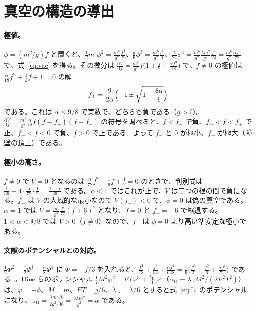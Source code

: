 \documentclass[a4paper,10pt]{ltjsarticle}
\newcommand{\dd}{\mathrm{d}}
\begin{document}
\section{真空の構造の導出}\label{app:vacuum}

\paragraph{極値。}$\phi=(m^2/g)f$ と置くと、$\frac12m^2\phi^2=\frac{m^6}{g^2}\frac{f^2}{2}$、$\frac g6\phi^3=\frac{m^6}{g^2}\frac{f^3}{6}$、$\frac{\lambda}{24}\phi^4=\frac{m^6}{g^2}\frac{\lambda m^2}{g^2}\frac{f^4}{24}=\frac{m^6}{g^2}\frac{\alpha f^4}{72}$ で、式~\eqref{eq:vac} を得る。その微分は $\frac{\dd V}{\dd f}=\frac{m^6}{g^2}f\bigl(1+\frac f2+\frac{\alpha f^2}{18}\bigr)$ で、$f\ne0$ の極値は $\frac{\alpha}{18}f^2+\frac12f+1=0$ の解
\begin{equation*}
f_\pm=\frac{9}{2\alpha}\Bigl(-1\pm\sqrt{1-\frac{8\alpha}{9}}\Bigr)
\end{equation*}
である。これは $\alpha\le9/8$ で実数で、どちらも負である（$g>0$）。$\frac{\dd V}{\dd f}=\frac{m^6}{g^2}\frac{\alpha}{18}f(f-f_+)(f-f_-)$ の符号を調べると、$f<f_-$ で負、$f_-<f<f_+$ で正、$f_+<f<0$ で負、$f>0$ で正である。よって $f_-$ と $0$ が極小、$f_+$ が極大（障壁の頂上）である。

\paragraph{極小の高さ。}$f\ne0$ で $V=0$ となるのは $\frac{\alpha}{72}f^2+\frac16f+\frac12=0$ のときで、判別式は $\frac1{36}-4\cdot\frac{\alpha}{72}\cdot\frac12=\frac{1-\alpha}{36}$ である。$\alpha<1$ ではこれが正で、$V$ は二つの根の間で負になる。$f_-$ は $V$ の大域的な最小なので $V(f_-)<0$ で、$\phi=0$ は偽の真空である。$\alpha=1$ では $V=\frac{m^6}{g^2}\frac{f^2}{72}(f+6)^2$ となり、$f=0$ と $f_-=-6$ で縮退する。$1<\alpha<9/8$ では $V>0$（$f\neq0$）なので、$f_-$ は $\phi=0$ より高い準安定な極小である。

\paragraph{文献のポテンシャルとの対応。}$\frac12\Phi^2-\frac12\Phi^3+\frac\alpha8\Phi^4$ に $\Phi=-f/3$ を入れると、$\frac{f^2}{18}+\frac{f^3}{54}+\frac{\alpha f^4}{648}=\frac19\bigl(\frac{f^2}2+\frac{f^3}6+\frac{\alpha f^4}{72}\bigr)$ である~\cite{dunnemin}。Dine らのポテンシャル $\frac12M^2\varphi^2-ET\varphi^3+\frac{\lambda_{\mathrm D}}4\varphi^4$（$\alpha_{\mathrm D}=\lambda_{\mathrm D}M^2/(2E^2T^2)$）~\cite{dine92} は、$\varphi=-\phi$、$M=m$、$ET=g/6$、$\lambda_{\mathrm D}=\lambda/6$ とすると式~\eqref{eq:L} のポテンシャルになり、$\alpha_{\mathrm D}=\frac{\lambda m^2/6}{2g^2/36}=\frac{3\lambda m^2}{g^2}=\alpha$ である。
\end{document}
